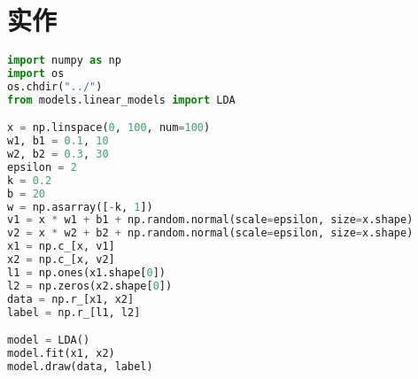 \documentclass{report}
\begin{document}
\section{实作}
\begin{lstlisting}[language={python}]
import numpy as np
import os
os.chdir("../")
from models.linear_models import LDA

x = np.linspace(0, 100, num=100)
w1, b1 = 0.1, 10
w2, b2 = 0.3, 30
epsilon = 2
k = 0.2
b = 20
w = np.asarray([-k, 1])
v1 = x * w1 + b1 + np.random.normal(scale=epsilon, size=x.shape)
v2 = x * w2 + b2 + np.random.normal(scale=epsilon, size=x.shape)
x1 = np.c_[x, v1]
x2 = np.c_[x, v2]
l1 = np.ones(x1.shape[0])
l2 = np.zeros(x2.shape[0])
data = np.r_[x1, x2]
label = np.r_[l1, l2]

model = LDA()
model.fit(x1, x2)
model.draw(data, label)
\end{lstlisting}
\end{document}
